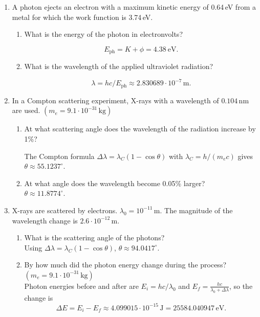\documentclass[a4paper,12pt]{letter}
\begin{document}
\begin{enumerate}
\item A photon ejects an electron with a maximum kinetic energy of 0.64\,eV from a metal for which the work function is 3.74\,eV.
\begin{enumerate}
\item What is the energy of the photon in electronvolts?

  $$E_\text{ph}=K+\phi=4.38\ \text{eV.}$$
  
\item What is the wavelength of the applied ultraviolet radiation?

$$\lambda=hc/E_\text{ph}\approx 2.830689\cdot 10^{-7}\,\text{m.}$$
\end{enumerate}

\pagebreak
\item In a Compton scattering experiment, X-rays with a wavelength of $0.104\,\text{nm}$ are used. $(m_{e} = 9.1 \cdot 10^{-31}\,\text{kg})$
    \begin{enumerate}
    \item At what scattering angle does the wavelength of the radiation increase by 1\%?

      \smallskip
      The Compton formula $\Delta\lambda=\lambda_{C}(1-\cos\theta)$ with $\lambda_{C}=h/(m_{e}c)$ gives $\theta \approx 55.1237^{\circ}$.
     
        \item At what angle does the wavelength become 0.05\% larger?\\$\theta \approx 11.8774^{\circ}$.
    \end{enumerate}

 \item X-rays are scattered by electrons. $\lambda_0 = 10^{-11}\,\text{m}$. The magnitude of the wavelength change is $2.6 \cdot 10^{-12}\,\text{m}$.
    \begin{enumerate}
    \item What is the scattering angle of the photons?\\

      Using $\Delta\lambda=\lambda_{C}(1-\cos\theta)$, $\theta \approx 94.0417^{\circ}$.
    
    \item By how much did the photon energy change during the process? $(m_e = 9.1 \cdot 10^{-31}\,\text{kg})$\\

Photon energies before and after are $E_{i}=hc/\lambda_{0}$ and $E_{f}=\frac{hc}{\lambda_{0}+\Delta\lambda}$, so the change is $$\Delta E = E_{i}-E_{f} \approx 4.099015\cdot 10^{-15}\,\text{J}=25584.040947\,\text{eV}.$$
    \end{enumerate}

\end{enumerate}

\bigskip


\vfill
\end{document}
